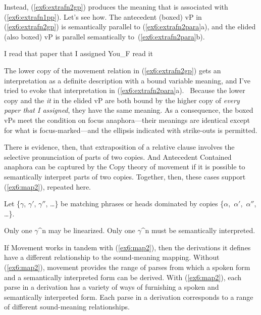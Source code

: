Instead, (\ref{ex6:extrafn2gp}) produces the meaning that is associated with (\ref{ex6:extrafn1pp}). Let's see how. The antecedent (boxed) vP in (\ref{ex6:extrafn2gp}) is semantically parallel to (\ref{ex6:extrafn2para}a), and the elided (also boxed) vP is parallel semantically to~(\ref{ex6:extrafn2para}b).
\begin{exe}
\raggedright
	\ex \label{ex6:extrafn2para}
	\begin{xlist}
		\ex I read that paper that I assigned
		\ex You_F read it
	\end{xlist}
\end{exe}
The lower copy of the movement relation in (\ref{ex6:extrafn2gp}) gets an interpretation as a definite description with a bound variable meaning, and I've tried to evoke that interpretation in (\ref{ex6:extrafn2para}a).%
%
%
%
\ Because the lower copy and the \emph{it} in the elided vP are both bound by the higher copy of \emph{every paper that I assigned}, they have the same meaning. As a consequence, the boxed vPs meet the condition on focus anaphora---their meanings are identical except for what is focus-marked---and the ellipsis indicated with strike-outs is permitted.

There is evidence, then, that extraposition of a relative clause involves the selective pronunciation of parts of two copies. And Antecedent Contained anaphora can be captured by the Copy theory of movement if it is possible to semantically interpret parts of two copies. Together, then, these cases support (\ref{ex6:map2}), repeated here.
\begin{exe}
	\raggedright
		\exr{ex6:map2}
		Let \{$\gamma$, $\gamma '$, $\gamma ''$, \ldots\} be matching phrases or heads dominated by copies \{$\alpha$,~$\alpha '$,~$\alpha ''$, \ldots\}.
		\begin{xlist}
			\ex Only one $\gamma$^n may be linearized.
			\ex Only one $\gamma$^n must be semantically interpreted.
		\end{xlist}
\end{exe}
If Movement works in tandem with (\ref{ex6:map2}), then the derivations it defines have a  different relationship to the sound-meaning mapping. Without (\ref{ex6:map2}), movement provides the range of parses from which a spoken form and a semantically interpreted form can be derived. With (\ref{ex6:map2}), each parse in a derivation has a variety of ways of furnishing a spoken and semantically interpreted form. Each parse in a derivation corresponds to a range of different sound-meaning relationships.

